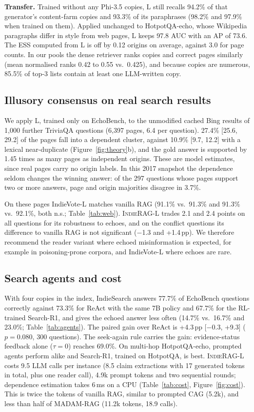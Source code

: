 \documentclass[sigconf,review,anonymous]{acmart}
\newcommand{\sys}{\textsc{IndieRAG}}
\newcommand{\pp}{\,pp}
\newcommand{\para}[1]{\smallskip\noindent\textbf{#1}\enspace}
\begin{document}

\para{Transfer.} Trained without any Phi-3.5 copies, L still recalls 94.2\% of that generator's content-farm copies and
93.3\% of its paraphrases (98.2\% and 97.9\% when trained on them). Applied unchanged to HotpotQA-echo, whose Wikipedia
paragraphs differ in style from web pages, L keeps 97.8 AUC with an AP of 73.6. The ESS computed from L is off by 0.12
origins on average, against 3.0 for page counts. In our pools the dense retriever ranks copies and correct pages
similarly (mean normalised ranks 0.42 to 0.55 vs.\ 0.425), and because copies are numerous, 85.5\% of top-3 lists
contain at least one LLM-written copy.

\subsection{Illusory consensus on real search results}\label{sec:web}
We apply L, trained only on EchoBench, to the unmodified cached Bing results of 1{,}000 further TriviaQA questions
(6{,}397 pages, 6.4 per question). 27.4\% [25.6, 29.2] of the pages fall into a dependent cluster, against 10.9\%
[9.7, 12.2] with a lexical near-duplicate (Figure~\ref{fig:theory}b), and the gold answer is supported by 1.45 times
as many pages as independent origins. These are model estimates, since real pages carry no origin labels. In this 2017
snapshot the dependence seldom changes the winning answer: of the 297 questions whose pages support two or more
answers, page and origin majorities disagree in 3.7\%.



On these pages IndieVote-L matches vanilla RAG (91.1\% vs.\ 91.3\% and 91.3\% vs.\ 92.1\%, both n.s.;
Table~\ref{tab:web}). \sys{}-L trades 2.1 and 2.4 points on all questions for its robustness to echoes, and on the
conflict questions its difference to vanilla RAG is not significant ($-$1.3 and +1.4\pp). We therefore recommend the
reader variant where echoed misinformation is expected, for example in poisoning-prone corpora, and IndieVote-L where
echoes are rare.

\subsection{Search agents and cost}\label{sec:agents}
With four copies in the index, IndieSearch answers 77.7\% of EchoBench questions correctly against 73.3\% for ReAct with
the same 7B policy and 67.7\% for the RL-trained Search-R1, and gives the echoed answer less often (14.7\% vs.\ 16.7\%
and 23.0\%; Table~\ref{tab:agents}). The paired gain over ReAct is +4.3\pp{} [$-$0.3, +9.3] ($p{=}0.080$, 300
questions). The seek-again rule carries the gain: evidence-status feedback alone ($\tau{=}0$) reaches 69.0\%. On
multi-hop HotpotQA-echo, prompted agents perform alike and Search-R1, trained on HotpotQA, is best.
\sys{}-L costs 9.5 LLM calls per instance (8.5 claim extractions with 17 generated tokens in total, plus one reader
call), 4.9k prompt tokens and two sequential rounds; dependence estimation takes 6\,ms on a CPU (Table~\ref{tab:cost},
Figure~\ref{fig:cost}). This is twice the tokens of vanilla RAG, similar to prompted CAG (5.2k), and less than half of
MADAM-RAG (11.2k tokens, 18.9 calls).
\end{document}
